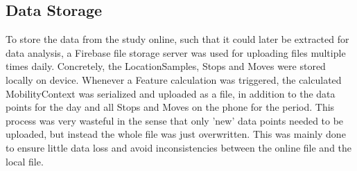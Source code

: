 \subsection{Data Storage}
To store the data from the study online, such that it could later be extracted for data analysis, a Firebase file storage server was used for uploading files multiple times daily. Concretely, the LocationSamples, Stops and Moves were stored locally on device. Whenever a Feature calculation was triggered, the calculated MobilityContext was serialized and uploaded as a file, in addition to the data points for the day and all Stops and Moves on the phone for the period. This process was very wasteful in the sense that only 'new' data points needed to be uploaded, but instead the whole file was just overwritten. This was mainly done to ensure little data loss and avoid inconsistencies between the online file and the local file.
